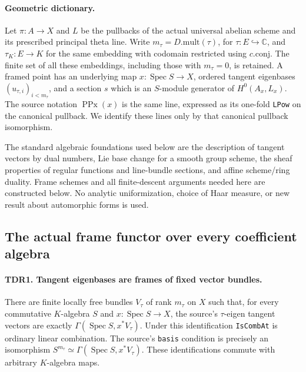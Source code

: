 \paragraph{Geometric dictionary.}
Let \(\pi:A\to X\) and \(L\) be the pullbacks of the actual universal
abelian scheme and its prescribed principal theta line.  Write
\(m_\tau=D.\mathrm{mult}(\tau)\), for
\(\tau:E\hookrightarrow\mathbb C\), and
\(\tau_K:E\to K\) for the same embedding with codomain restricted
using \(c.\mathrm{conj}\).  The finite set of all these embeddings,
including those with \(m_\tau=0\), is retained.  A framed point has an
underlying map \(x:\operatorname{Spec}S\to X\), ordered tangent
eigenbases \((u_{\tau,i})_{i<m_\tau}\), and a section \(s\) which is
an \(S\)-module generator of \(H^0(A_x,L_x)\).  The source notation
\(\operatorname{PPx}(x)\) is the same line, expressed as its
one-fold \texttt{LPow} on the canonical pullback.  We identify these
lines only by that canonical pullback isomorphism.

The standard algebraic foundations used below are the description of
tangent vectors by dual numbers, Lie base change for a smooth group
scheme, the sheaf properties of regular functions and line-bundle
sections, and affine scheme/ring duality.  Frame schemes and all
finite-descent arguments needed here are constructed below.  No
analytic uniformization, choice of Haar measure, or new result about
automorphic forms is used.

\subsection{The actual frame functor over every coefficient algebra}

\paragraph{TDR1. Tangent eigenbases are frames of fixed vector bundles.}
\label{claim:TDR1}
There are finite locally free bundles \(V_\tau\) of rank \(m_\tau\)
on \(X\) such that, for every commutative \(K\)-algebra \(S\) and
\(x:\operatorname{Spec}S\to X\), the source's
\(\tau\)-eigen tangent vectors are exactly
\(\Gamma(\operatorname{Spec}S,x^*V_\tau)\).
Under this identification \texttt{IsCombAt} is ordinary linear
combination.  The source's \texttt{basis} condition is precisely an
isomorphism \(S^{m_\tau}\simeq\Gamma(\operatorname{Spec}S,x^*V_\tau)\).
These identifications commute with arbitrary \(K\)-algebra maps.

